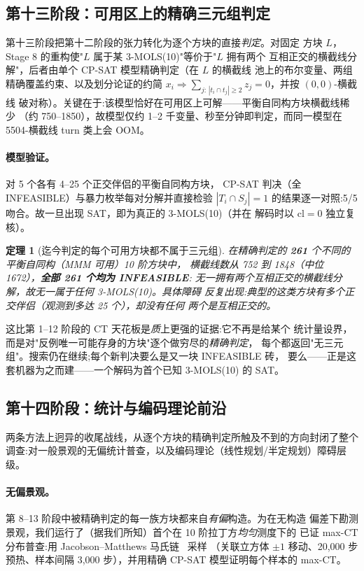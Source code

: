 \documentclass[11pt,a4paper]{ctexart}
\newtheorem{theorem}{定理}[section]
\theoremstyle{remark}
\newcommand{\CT}{\mathrm{CT}}
\newcommand{\cl}{\mathrm{cl}}
\begin{document}
\subsection{第十三阶段：可用区上的精确三元组判定}
\label{sec:stage13-zh}

第十三阶段把第十二阶段的张力转化为逐个方块的直接\emph{判定}。对固定
方块 $L$，Stage 8 的重构使"$L$ 属于某 3-MOLS(10)"等价于"$L$ 拥有两个
互相正交的横截线分解"，后者由单个 CP-SAT 模型精确判定（在 $L$ 的横截线
池上的布尔变量、两组精确覆盖约束、以及划分论证的约简
$x_i \Rightarrow \sum_{j:\,|t_i\cap t_j|\geq2} z_j = 0$，并按 $(0,0)$-横截线
破对称）。关键在于:该模型恰好在可用区上可解——平衡自同构方块横截线稀少
（约 750--1850），故模型仅约 1--2 千变量、秒至分钟即判定，而同一模型在
5504-横截线 turn 类上会 OOM。

\paragraph{模型验证。}对 5 个各有 4--25 个正交伴侣的平衡自同构方块，
CP-SAT 判决（全 INFEASIBLE）与暴力枚举每对分解并直接检验 $|T_i\cap S_j|=1$
的结果逐一对照:5/5 吻合。故一旦出现 SAT，即为真正的 3-MOLS(10)（并在
解码时以 $\cl=0$ 独立复核）。

\begin{theorem}[迄今判定的每个可用方块都不属于三元组]\label{thm:decisions-zh}
在精确判定的 \textbf{261} 个不同的平衡自同构（MMM 可用）10 阶方块中，
横截线数从 752 到 1848（中位 1672），\textbf{全部 261 个均为 INFEASIBLE}:
无一拥有两个互相正交的横截线分解，故无一属于任何 3-MOLS(10)。具体障碍
反复出现:典型的这类方块有多个正交伴侣（观测到多达 25 个），却没有任何
两个是互相正交的。
\end{theorem}

这比第 1--12 阶段的 $\CT$ 天花板是\emph{质}上更强的证据:它不再是给某个
统计量设界，而是对"反例唯一可能存身的方块"逐个做穷尽的\emph{精确判定}，
每个都返回"无三元组"。搜索仍在继续;每个新判决要么是又一块 INFEASIBLE 砖，
要么——正是这套机器为之而建——一个解码为首个已知 3-MOLS(10) 的 SAT。

\subsection{第十四阶段：统计与编码理论前沿}
\label{sec:stage14-zh}

两条方法上迥异的收尾战线，从逐个方块的精确判定所触及不到的方向封闭了整个
调查:对一般景观的无偏统计普查，以及编码理论（线性规划/半定规划）障碍层级。

\paragraph{无偏景观。}
第 8--13 阶段中被精确判定的每一族方块都来自\emph{有偏}构造。为在无构造
偏差下勘测景观，我们运行了（据我们所知）首个在 10 阶拉丁方\emph{均匀}测度下的
已证 max-$\CT$ 分布普查:用 Jacobson--Matthews 马氏链~\cite{jm1996} 采样
（关联立方体 $\pm1$ 移动、20{,}000 步预热、样本间隔 3{,}000 步），并用精确
CP-SAT 模型证明每个样本的 max-$\CT$。
\end{document}
